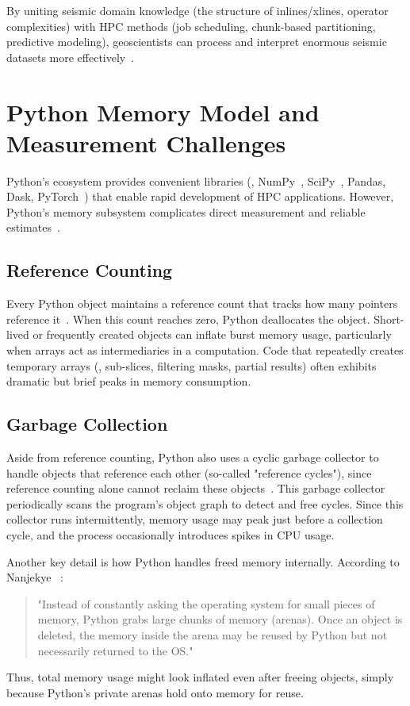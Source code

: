 By uniting seismic domain knowledge (the structure of inlines/xlines, operator complexities) with \ac{HPC} methods (job scheduling, chunk-based partitioning, predictive modeling), geoscientists can process and interpret enormous seismic datasets more effectively~\cite{Yilmaz2001}.


\section{Python Memory Model and Measurement Challenges}
\label{sec:fundamentals-python-memory}

Python's ecosystem provides convenient libraries (\eg, NumPy~\cite{numpy}, SciPy~\cite{virtanen2020scipy}, Pandas, Dask, PyTorch~\cite{paszke2019pytorch}) that enable rapid development of \ac{HPC} applications.
However, Python's memory subsystem complicates direct measurement and reliable estimates~\cite{Nanjekye2023}.

\subsection{Reference Counting}
\label{subsec:fundamentals-refcounting}

Every Python object maintains a reference count that tracks how many pointers reference it~\cite{Nanjekye2023}.
When this count reaches zero, Python deallocates the object.
Short-lived or frequently created objects can inflate burst memory usage, particularly when arrays act as intermediaries in a computation.
Code that repeatedly creates temporary arrays (\eg, sub-slices, filtering masks, partial results) often exhibits dramatic but brief peaks in memory consumption.

\subsection{Garbage Collection}
\label{subsec:fundamentals-gc}

Aside from reference counting, Python also uses a cyclic garbage collector to handle objects that reference each other (so-called "reference cycles"), since reference counting alone cannot reclaim these objects~\cite{Nanjekye2023}.
This garbage collector periodically scans the program's object graph to detect and free cycles.
Since this collector runs intermittently, memory usage may peak just before a collection cycle, and the process occasionally introduces spikes in \ac{CPU} usage.

Another key detail is how Python handles freed memory internally. According to Nanjekye \etal~\cite{Nanjekye2023}:
\begin{quote}
    "Instead of constantly asking the operating system for small pieces of memory, Python grabs large chunks of memory (arenas). Once an object is deleted, the memory inside the arena may be reused by Python but not necessarily returned to the OS."
\end{quote}
Thus, total memory usage might look inflated even after freeing objects, simply because Python's private arenas hold onto memory for reuse.

